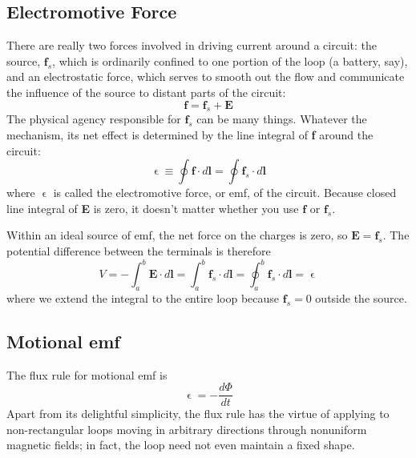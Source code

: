 \documentclass[../../../main.tex]{subfiles}
\begin{document}
\subsection{Electromotive Force}
There are really two forces involved in driving current around a circuit: the source, $\mathbf{f}_s$, which is ordinarily conﬁned to one portion of the loop (a battery, say), and an electrostatic force, which serves to smooth out the ﬂow and communicate the inﬂuence of the source to distant parts of the circuit:
\begin{equation*}
    \mathbf{f} = \mathbf{f}_s + \mathbf{E}
\end{equation*}
The physical agency responsible for $\mathbf{f}_s$ can be many things. Whatever the mechanism, its net effect is determined by the line integral of \textbf{f} around the circuit:
\begin{equation*}
    \upvarepsilon\equiv \oint\mathbf{f}\cdot d\mathbf{l}=\oint\mathbf{f}_s\cdot d\mathbf{l}
\end{equation*}
where $\upvarepsilon$ is called the electromotive force, or emf, of the circuit. Because closed line integral of \textbf{E} is zero, it doesn't matter whether you use $\mathbf{f}$ or $\mathbf{f}_s$.

Within an ideal source of emf, the net force on the charges is zero, so $\mathbf{E} = \mathbf{f}_s$. The potential difference between the terminals is therefore
\begin{equation*}
    V=-\int_{a}^{b}\mathbf{E}\cdot d\mathbf{l}=\int_{a}^{b}\mathbf{f}_s\cdot d\mathbf{l}= \oint_{a}^{b}\mathbf{f}_s\cdot d\mathbf{l}=\upvarepsilon
\end{equation*}
where we extend the integral to the entire loop because $\mathbf{f}_s = 0 $ outside the source.

\subsection{Motional emf}
The ﬂux rule for motional emf is
\begin{equation*}
    \upvarepsilon=-\frac{d\Phi}{dt}
\end{equation*}
Apart from its delightful simplicity, the ﬂux rule has the virtue of applying to non-rectangular loops moving in arbitrary directions through nonuniform magnetic ﬁelds; in fact, the loop need not even maintain a ﬁxed shape.
\end{document}
